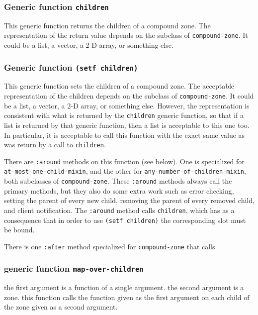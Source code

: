 \documentclass{report}
\begin{document}
\subsubsection{Generic function \texttt{children}}

This generic function returns the children of a compound zone.  The
representation of the return value depends on the subclass of
\texttt{compound-zone}.  It could be a list, a vector, a 2-D array, or
something else.

\subsubsection{Generic function \texttt{(setf children)}}

This generic function sets the children of a compound zone.  The
acceptable representation of the children depends on the subclass of
\texttt{compound-zone}.  It could be a list, a vector, a 2-D array, or
something else.  However, the representation is consistent with what
is returned by the \texttt{children} generic function, so that if a list is
returned by that generic function, then a list is acceptable to this
one too.  In particular, it is acceptable to call this function with
the exact same value as was return by a call to \texttt{children}.

There are \texttt{:around} methods on this function (see below).  One
is specialized for \texttt{at-most-one-child-mixin}, and the other for
\texttt{any-number-of-children-mixin}, both subclasses of
\texttt{compound-zone}.  These \texttt{:around} methods always call
the primary methods, but they also do some extra work such as error
checking, setting the parent of every new child, removing the parent
of every removed child, and client notification.  The \texttt{:around}
method calls \texttt{children}, which has as a consequence that in
order to use \texttt{(setf children)} the corresponding slot must be
bound.

There is one \texttt{:after} method specialized for
\texttt{compound-zone} that calls

\subsubsection{generic function \texttt{map-over-children}}

the first argument is a function of a single argument.  the second
argument is a zone.  this function calls the function given as the
first argument on each child of the zone given as a second argument.  
\end{document}
